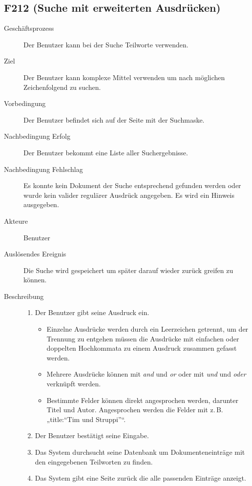 \subsection{F212 (Suche mit erweiterten Ausdrücken)}
\label{F:extSuche}
\begin{description}
  \item[Geschäftsprozess]Der Benutzer kann bei der Suche Teilworte verwenden.
  \item[Ziel]Der Benutzer kann komplexe Mittel verwenden um nach möglichen Zeichenfolgend zu suchen.
  \item[Vorbedingung]Der Benutzer befindet sich auf der Seite mit der Suchmaske.
  \item[Nachbedingung Erfolg]Der Benutzer bekommt eine Liste aller Suchergebnisse.
  \item[Nachbedingung Fehlschlag]Es konnte kein Dokument der Suche entsprechend gefunden werden oder wurde kein valider regulärer Ausdrück angegeben. Es wird ein Hinweis ausgegeben.
  \item[Akteure]Benutzer
  \item[Auslösendes Ereignis]Die Suche wird gespeichert um später darauf wieder zurück greifen zu können.
  \item[Beschreibung]\hfill
    \begin{enumerate}
      \item Der Benutzer gibt seine Ausdruck ein. 
	\begin{itemize}
	  \item Einzelne Ausdrücke werden durch ein Leerzeichen getrennt, um der Trennung zu entgehen müssen die Ausdrücke mit einfachen oder doppelten Hochkommata zu einem Ausdruck zusammen gefasst werden. 
	  \item Mehrere Ausdrücke können mit \emph{and} und \emph{or} oder mit \emph{und} und \emph{oder} verknüpft werden.
	  \item Bestimmte Felder können direkt angesprochen werden, darunter Titel und Autor. Angesprochen werden die Felder mit z.\,B. „title:``Tim und Struppi''“.
	\end{itemize}
      \item Der Benutzer bestätigt seine Eingabe.
      \item Das System durchsucht seine Datenbank um Dokumenteneinträge mit den eingegebenen Teilworten zu finden.
      \item Das System gibt eine Seite zurück die alle passenden Einträge anzeigt.
    \end{enumerate}
\end{description}


